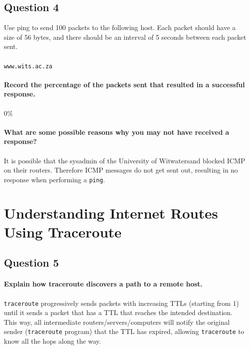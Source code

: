 \documentclass[12pt,a4paper]{article}
\begin{document}
		\newpage
		
		\subsection{Question 4}
			Use ping to send 100 packets to the following host. Each packet should have a size of 56 bytes, and there should be an interval of 5 seconds between each packet sent.
			\\
			\\
			\verb|www.wits.ac.za|
			\paragraph{Record the percentage of the packets sent that resulted in a successful response.}
			\paragraph{}
				0\%
			\paragraph{What are some possible reasons why you may not have received a response?}
			\paragraph{}
				It is possible that the sysadmin of the University of Witwatersand blocked ICMP on their routers. Therefore ICMP messages do not get sent out, resulting in no response when performing a \verb|ping|.
		\newpage
		
		\section{Understanding Internet Routes Using Traceroute}
			\subsection{Question 5}
				\paragraph{Explain how traceroute discovers a path to a remote host.}
				\paragraph{}
					\verb|traceroute| progressively sends packets with increasing TTLs (starting from 1) until it sends a packet that has a TTL that reaches the intended destination. This way, all intermediate routers/servers/computers will notify the original sender (\verb|traceroute| program) that the TTL has expired, allowing \verb|traceroute| to know all the hops along the way.
			
\end{document}
